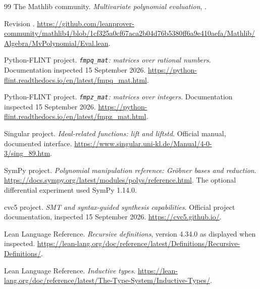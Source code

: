 \begin{thebibliography}{99}
 The Mathlib community.
\emph{Multivariate polynomial evaluation},
.\par
Revision .
\url{https://github.com/leanprover-community/mathlib4/blob/1cf325a0cf67aca2b04d76b5380ff6a9e410aefa/Mathlib/Algebra/MvPolynomial/Eval.lean}.

 Python-FLINT project.
\emph{\texttt{fmpq\_mat}: matrices over rational numbers}.
Documentation inspected 15 September 2026.
\url{https://python-flint.readthedocs.io/en/latest/fmpq_mat.html}.

 Python-FLINT project.
\emph{\texttt{fmpz\_mat}: matrices over integers}.
Documentation inspected 15 September 2026.
\url{https://python-flint.readthedocs.io/en/latest/fmpz_mat.html}.

 Singular project.
\emph{Ideal-related functions: lift and liftstd}.
Official manual, documented interface.
\url{https://www.singular.uni-kl.de/Manual/4-0-3/sing_89.htm}.

 SymPy project.
\emph{Polynomial manipulation reference: Gr\"obner bases and reduction}.
\url{https://docs.sympy.org/latest/modules/polys/reference.html}.
The optional differential experiment used SymPy 1.14.0.

 cvc5 project.
\emph{SMT and syntax-guided synthesis capabilities}.
Official project documentation, inspected 15 September 2026.
\url{https://cvc5.github.io/}.

 Lean Language Reference.
\emph{Recursive definitions}, version 4.34.0 as displayed when inspected.
\url{https://lean-lang.org/doc/reference/latest/Definitions/Recursive-Definitions/}.

 Lean Language Reference.
\emph{Inductive types}.
\url{https://lean-lang.org/doc/reference/latest/The-Type-System/Inductive-Types/}.
\end{thebibliography}
